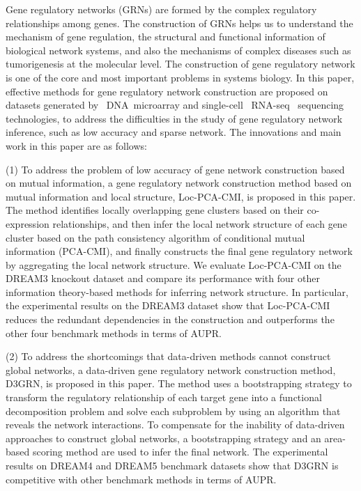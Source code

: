\begin{abstracten}\setlength{\baselineskip}{20pt}


Gene regulatory networks (GRNs) are formed by the complex regulatory relationships among genes. 
The construction of GRNs helps us to understand the mechanism of gene regulation, the structural and functional information of biological network systems, and also the mechanisms of complex diseases such as tumorigenesis at the molecular level.
The construction of gene regulatory network is one of the core and most important problems in systems biology.
In this paper, effective methods for gene regulatory network construction are proposed on datasets generated by ~DNA~microarray and single-cell ~RNA-seq~ sequencing technologies, 
to address  the difficulties in the study of gene regulatory network inference, such as low accuracy and sparse network.
The innovations and main work in this paper are as follows:

(1) To address the problem of low accuracy of gene network construction based on mutual information, 
a gene regulatory network construction method based on mutual information and local structure, Loc-PCA-CMI, is proposed in this paper. 
The method identifies locally overlapping gene clusters based on their co-expression relationships, and then infer the local network structure of each gene cluster based on the path consistency algorithm of conditional mutual information (PCA-CMI), 
and finally constructs the final gene regulatory network by aggregating the local network structure.
We evaluate Loc-PCA-CMI on the DREAM3 knockout dataset and compare its performance with four other information theory-based methods for inferring network structure.
In particular, the experimental results on the DREAM3 dataset show that Loc-PCA-CMI~ reduces the redundant dependencies 
in the construction  and outperforms the other four benchmark methods in terms of AUPR.

(2) To address the shortcomings that data-driven methods cannot construct global networks, 
a data-driven gene regulatory network construction method, D3GRN, is proposed in this paper. 
The method uses a bootstrapping strategy to transform the regulatory relationship of each target gene into a functional decomposition problem and solve each subproblem by using an algorithm that reveals the network interactions. 
To compensate for the inability of data-driven approaches to construct global networks, 
a bootstrapping strategy and an area-based scoring method are used to infer the final network. 
The experimental results on DREAM4 and DREAM5 benchmark datasets show that D3GRN is competitive with other benchmark methods in terms of AUPR.



\end{abstracten}
